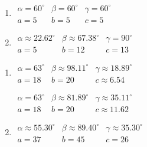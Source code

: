 \begin{multicols}{2} 

\begin{enumerate}

\setcounter{enumi}{\value{HW}}

\item $\begin{array}{lll}
\alpha = 60^{\circ} & \beta = 60^{\circ} & \gamma = 60^{\circ} \\
a = 5 & b = 5 & c = 5 \end{array}$

\item $\begin{array}{lll}
\alpha \approx 22.62^{\circ} & \beta \approx 67.38^{\circ} & \gamma = 90^{\circ} \\
a = 5 & b = 12 & c = 13 \end{array}$

\setcounter{HW}{\value{enumi}}

\end{enumerate}

\end{multicols}

\begin{multicols}{2}

\begin{enumerate}

\setcounter{enumi}{\value{HW}}

\item $\begin{array}{lll}
\alpha = 63^{\circ} & \beta \approx 98.11^{\circ} & \gamma \approx 18.89^{\circ} \\
a = 18 & b = 20 & c \approx 6.54 \end{array}$

$\begin{array}{lll}
\alpha = 63^{\circ} & \beta \approx 81.89^{\circ} & \gamma \approx 35.11^{\circ} \\
a = 18 & b = 20 & c \approx 11.62 \end{array}$

\item $\begin{array}{lll}
\alpha \approx 55.30^{\circ} & \beta \approx 89.40^{\circ} & \gamma \approx 35.30^{\circ} \\
a = 37 & b = 45 & c = 26 \end{array}$

\setcounter{HW}{\value{enumi}}

\end{enumerate}

\end{multicols}

